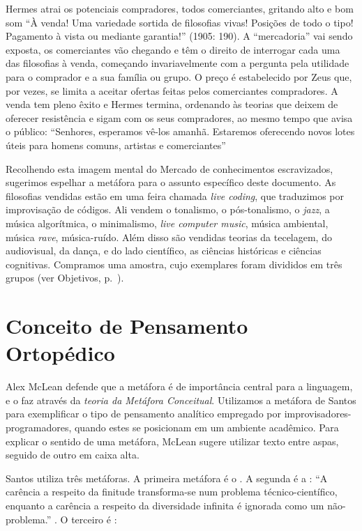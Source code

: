 \begin{citacao}
Hermes atrai os potenciais compradores, todos comerciantes, gritando alto e bom som “À venda! Uma variedade sortida de filosofias vivas! Posições de todo o tipo! Pagamento à vista ou mediante garantia!” (1905: 190). A “mercadoria” vai sendo exposta, os comerciantes vão chegando e têm o direito de interrogar cada uma das filosofias à venda, começando invariavelmente com a pergunta pela utilidade para o comprador e a sua família ou grupo. O preço é estabelecido por Zeus que, por vezes, se limita a aceitar ofertas feitas pelos comerciantes compradores. A venda tem pleno êxito e Hermes termina, ordenando às teorias que deixem de oferecer resistência e sigam com os seus compradores, ao mesmo tempo que avisa o público: “Senhores, esperamos vê-los amanhã. Estaremos oferecendo novos lotes úteis para homens comuns, artistas e comerciantes”   
\end{citacao}

Recolhendo esta imagem mental do Mercado de conhecimentos escravizados, sugerimos espelhar a metáfora para o assunto específico deste documento. As filosofias vendidas estão em uma feira chamada \emph{live coding}, que traduzimos por  improvisação de códigos. Ali vendem o tonalismo, o pós-tonalismo, o \emph{jazz}, a música algorítmica, o minimalismo, \emph{live computer music}, música ambiental, música \emph{rave},  música-ruído. Além disso são vendidas teorias da tecelagem, do audiovisual, da dança, e do lado científico, as ciências históricas e ciências cognitivas. Compramos uma amostra, cujo exemplares foram divididos em três grupos (ver Objetivos, p.~\pageref{sec:objetivos}).


\section*{Conceito de Pensamento Ortopédico}

Alex McLean defende que a metáfora é de importância central para a linguagem, e o faz através da \emph{teoria da Metáfora Conceitual}. Utilizamos a metáfora de Santos para exemplificar o tipo de pensamento analítico empregado por improvisadores-programadores, quando estes se posicionam em um ambiente acadêmico. Para explicar o sentido de uma metáfora, McLean sugere utilizar texto entre aspas, seguido de outro em caixa alta. 

Santos utiliza três metáforas. A primeira metáfora é o . A segunda é a : ``A carência a respeito da finitude transforma-se num problema técnico-científico, enquanto a carência a respeito da diversidade infinita é ignorada como um não-problema.'' \cite[p.~15]{santos_filosofia_2008}. O terceiro é  \cite[p.~1--4]{santos_abissal_2007}:

